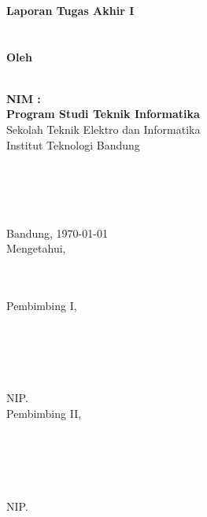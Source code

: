 \documentclass[../main/main.tex]{subfiles}
\begin{document}
\begin{titlepage}
\makeatletter
\begin{center}
\begin{spacing}{\double}
\textbf{\MakeUppercase{\large \@title}}\\ %
\end{spacing}
~\\
~\\
\textbf{\large Laporan Tugas Akhir I}\\ %
~\\
~\\
\textbf{Oleh}\\
\begin{spacing}{\semidouble}
\textbf{\MakeUppercase{\large \@author}}\\ %
\textbf{\MakeUppercase{\large NIM : \@nim}}\\ %
\textbf{\large Program Studi Teknik Informatika}\\ %
Sekolah Teknik Elektro dan Informatika\\
Institut Teknologi Bandung\\
\end{spacing}
~\\
~\\
~\\
~\\
Bandung, \today\\
Mengetahui,\\
~\\
~\\
\begin{multicols}{2}
Pembimbing I,
~\\
~\\
~\\
~\\
~\\
\underline{\@pembimbingI}\\
NIP. \@nipI\\
Pembimbing II,
~\\
~\\
~\\
~\\
~\\
\underline{\@pembimbingII}\\
NIP. \@nipII
\end{multicols}
\end{center}
\makeatother
\end{titlepage}
\end{document}
